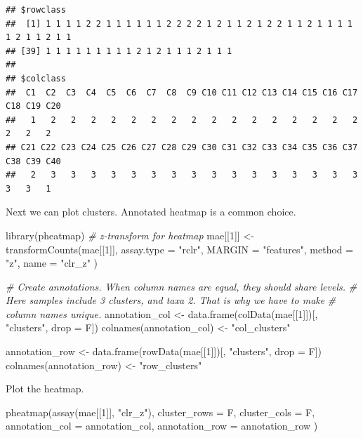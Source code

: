 \documentclass[
]{book}
\newenvironment{Shaded}{\begin{snugshade}}{\end{snugshade}}
\newcommand{\AttributeTok}[1]{\textcolor[rgb]{0.77,0.63,0.00}{#1}}
\newcommand{\CommentTok}[1]{\textcolor[rgb]{0.56,0.35,0.01}{\textit{#1}}}
\newcommand{\DecValTok}[1]{\textcolor[rgb]{0.00,0.00,0.81}{#1}}
\newcommand{\FunctionTok}[1]{\textcolor[rgb]{0.00,0.00,0.00}{#1}}
\newcommand{\NormalTok}[1]{#1}
\newcommand{\OtherTok}[1]{\textcolor[rgb]{0.56,0.35,0.01}{#1}}
\newcommand{\StringTok}[1]{\textcolor[rgb]{0.31,0.60,0.02}{#1}}
\begin{document}
\begin{verbatim}
## $rowclass
##  [1] 1 1 1 1 2 2 1 1 1 1 1 1 2 2 2 2 1 2 1 1 2 1 2 2 1 1 2 1 1 1 1 1 2 1 1 2 1 1
## [39] 1 1 1 1 1 1 1 1 1 2 1 2 1 1 1 2 1 1 1
## 
## $colclass
##  C1  C2  C3  C4  C5  C6  C7  C8  C9 C10 C11 C12 C13 C14 C15 C16 C17 C18 C19 C20 
##   1   2   2   2   2   2   2   2   2   2   2   2   2   2   2   2   2   2   2   2 
## C21 C22 C23 C24 C25 C26 C27 C28 C29 C30 C31 C32 C33 C34 C35 C36 C37 C38 C39 C40 
##   2   3   3   3   3   3   3   3   3   3   3   3   3   3   3   3   3   3   3   1
\end{verbatim}

Next we can plot clusters. Annotated heatmap is a common choice.

\begin{Shaded}
\begin{Highlighting}[]
\FunctionTok{library}\NormalTok{(pheatmap)}
\CommentTok{\# z{-}transform for heatmap}
\NormalTok{mae[[}\DecValTok{1}\NormalTok{]] }\OtherTok{\textless{}{-}} \FunctionTok{transformCounts}\NormalTok{(mae[[}\DecValTok{1}\NormalTok{]],}
  \AttributeTok{assay.type =} \StringTok{"rclr"}\NormalTok{,}
  \AttributeTok{MARGIN =} \StringTok{"features"}\NormalTok{,}
  \AttributeTok{method =} \StringTok{"z"}\NormalTok{, }\AttributeTok{name =} \StringTok{"clr\_z"}
\NormalTok{)}

\CommentTok{\# Create annotations. When column names are equal, they should share levels.}
\CommentTok{\# Here samples include 3 clusters, and taxa 2. That is why we have to make}
\CommentTok{\# column names unique.}
\NormalTok{annotation\_col }\OtherTok{\textless{}{-}} \FunctionTok{data.frame}\NormalTok{(}\FunctionTok{colData}\NormalTok{(mae[[}\DecValTok{1}\NormalTok{]])[, }\StringTok{"clusters"}\NormalTok{, }\AttributeTok{drop =}\NormalTok{ F])}
\FunctionTok{colnames}\NormalTok{(annotation\_col) }\OtherTok{\textless{}{-}} \StringTok{"col\_clusters"}

\NormalTok{annotation\_row }\OtherTok{\textless{}{-}} \FunctionTok{data.frame}\NormalTok{(}\FunctionTok{rowData}\NormalTok{(mae[[}\DecValTok{1}\NormalTok{]])[, }\StringTok{"clusters"}\NormalTok{, }\AttributeTok{drop =}\NormalTok{ F])}
\FunctionTok{colnames}\NormalTok{(annotation\_row) }\OtherTok{\textless{}{-}} \StringTok{"row\_clusters"}
\end{Highlighting}
\end{Shaded}

Plot the heatmap.

\begin{Shaded}
\begin{Highlighting}[]
\FunctionTok{pheatmap}\NormalTok{(}\FunctionTok{assay}\NormalTok{(mae[[}\DecValTok{1}\NormalTok{]], }\StringTok{"clr\_z"}\NormalTok{),}
  \AttributeTok{cluster\_rows =}\NormalTok{ F, }\AttributeTok{cluster\_cols =}\NormalTok{ F,}
  \AttributeTok{annotation\_col =}\NormalTok{ annotation\_col,}
  \AttributeTok{annotation\_row =}\NormalTok{ annotation\_row}
\NormalTok{)}
\end{Highlighting}
\end{Shaded}
\end{document}
